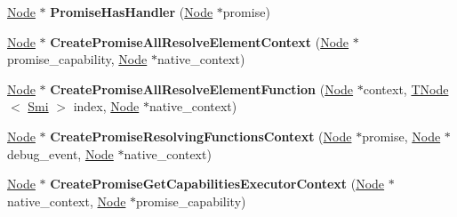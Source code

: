 \begin{DoxyCompactItemize}
\item 
\mbox{\label{classv8_1_1internal_1_1PromiseBuiltinsAssembler_a5bf0e6c485533a27040936893adab80d}} 
\mbox{\hyperlink{classv8_1_1internal_1_1compiler_1_1Node}{Node}} $\ast$ {\bfseries Promise\+Has\+Handler} (\mbox{\hyperlink{classv8_1_1internal_1_1compiler_1_1Node}{Node}} $\ast$promise)
\item 
\mbox{\label{classv8_1_1internal_1_1PromiseBuiltinsAssembler_ac61d1dc18a6ea7100549f8d0bcddb653}} 
\mbox{\hyperlink{classv8_1_1internal_1_1compiler_1_1Node}{Node}} $\ast$ {\bfseries Create\+Promise\+All\+Resolve\+Element\+Context} (\mbox{\hyperlink{classv8_1_1internal_1_1compiler_1_1Node}{Node}} $\ast$promise\+\_\+capability, \mbox{\hyperlink{classv8_1_1internal_1_1compiler_1_1Node}{Node}} $\ast$native\+\_\+context)
\item 
\mbox{\label{classv8_1_1internal_1_1PromiseBuiltinsAssembler_a3cb3e41eed388a10b6e51ee98362dd19}} 
\mbox{\hyperlink{classv8_1_1internal_1_1compiler_1_1Node}{Node}} $\ast$ {\bfseries Create\+Promise\+All\+Resolve\+Element\+Function} (\mbox{\hyperlink{classv8_1_1internal_1_1compiler_1_1Node}{Node}} $\ast$context, \mbox{\hyperlink{classv8_1_1internal_1_1compiler_1_1TNode}{T\+Node}}$<$ \mbox{\hyperlink{classv8_1_1internal_1_1Smi}{Smi}} $>$ index, \mbox{\hyperlink{classv8_1_1internal_1_1compiler_1_1Node}{Node}} $\ast$native\+\_\+context)
\item 
\mbox{\label{classv8_1_1internal_1_1PromiseBuiltinsAssembler_a8f421d09e69d4e955820cec3ea73c068}} 
\mbox{\hyperlink{classv8_1_1internal_1_1compiler_1_1Node}{Node}} $\ast$ {\bfseries Create\+Promise\+Resolving\+Functions\+Context} (\mbox{\hyperlink{classv8_1_1internal_1_1compiler_1_1Node}{Node}} $\ast$promise, \mbox{\hyperlink{classv8_1_1internal_1_1compiler_1_1Node}{Node}} $\ast$debug\+\_\+event, \mbox{\hyperlink{classv8_1_1internal_1_1compiler_1_1Node}{Node}} $\ast$native\+\_\+context)
\item 
\mbox{\label{classv8_1_1internal_1_1PromiseBuiltinsAssembler_a7bcd0b6121e4cdd72398e21247d84400}} 
\mbox{\hyperlink{classv8_1_1internal_1_1compiler_1_1Node}{Node}} $\ast$ {\bfseries Create\+Promise\+Get\+Capabilities\+Executor\+Context} (\mbox{\hyperlink{classv8_1_1internal_1_1compiler_1_1Node}{Node}} $\ast$native\+\_\+context, \mbox{\hyperlink{classv8_1_1internal_1_1compiler_1_1Node}{Node}} $\ast$promise\+\_\+capability)
\end{DoxyCompactItemize}
